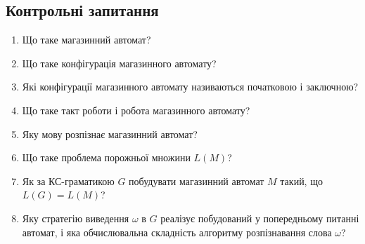 \subsection{Контрольні запитання}

\begin{enumerate}
	\item Що таке магазинний автомат? %
	\item Що таке конфігурація магазинного автомату? %
	\item Які конфігурації магазинного автомату називаються початковою і заключною? %
	\item Що таке такт роботи і робота магазинного автомату? %
	\item Яку мову розпізнає магазинний автомат? %
	\item Що таке проблема порожньої множини $L(M)$? %
	\item Як за КС-граматикою $G$ побудувати магазинний автомат $M$ такий, що $L(G) = L(M)$?
	\item Яку стратегію виведення $\omega$ в $G$ реалізує побудований у попередньому питанні автомат, і яка обчислювальна складність алгоритму розпізнавання слова $\omega$? %
\end{enumerate}